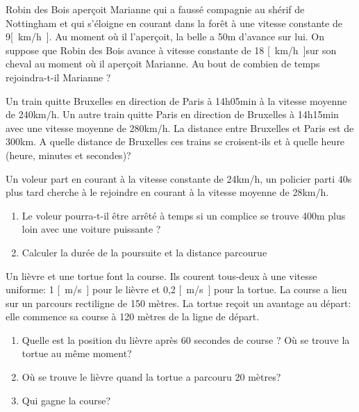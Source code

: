 \begin{exercise}
    Robin des Bois aperçoit Marianne qui a faussé compagnie au shérif de Nottingham et qui s'éloigne en courant dans la forêt à une vitesse constante de 9\unit{[km/h]}. Au moment où il l'aperçoit, la belle a 50m d'avance sur lui. On suppose que Robin des Bois avance à vitesse constante de 18 \unit{[km/h]}sur son cheval au moment où il aperçoit Marianne. Au bout de combien de temps rejoindra-t-il Marianne ?
\end{exercise}

\begin{exercise}
    Un train quitte Bruxelles en direction de Paris à 14h05min à la vitesse moyenne de 240km/h. Un autre train quitte Paris en direction de Bruxelles à 14h15min avec une vitesse moyenne de 280km/h. La distance entre Bruxelles et Paris est de 300km. A quelle distance de Bruxelles ces trains se croisent-ils et à quelle heure (heure, minutes et secondes)?
\end{exercise}

\begin{exercise}
    Un voleur part en courant à la vitesse constante de 24km/h, un policier parti 40s plus tard cherche à le rejoindre en courant à la vitesse moyenne de 28km/h.
    \begin{enumerate}[label=\alph*)]
        \item Le voleur pourra-t-il être arrêté à temps si un complice se trouve 400m plus loin avec une voiture puissante ?
        \item Calculer la durée de la poursuite et la distance parcourue
    \end{enumerate}
\end{exercise}

\begin{exercise}
    Un lièvre et une tortue font la course. Ils courent tous-deux à une vitesse uniforme: 1 \unit{[m/s]} pour le lièvre et 0,2 \unit{[m/s]} pour la tortue. La course a lieu sur un parcours rectiligne de 150 mètres. La tortue reçoit un avantage au départ: elle commence sa course à 120 mètres de la ligne de départ.
    \begin{enumerate}[label=\alph*)]
        \item Quelle est la position du lièvre après 60 secondes de course ? Où se trouve la tortue au même moment?
        \item Où se trouve le lièvre quand la tortue a parcouru 20 mètres?
        \item Qui gagne la course?
    \end{enumerate}
\end{exercise}
\begin{exercise}
\end{exercise}
